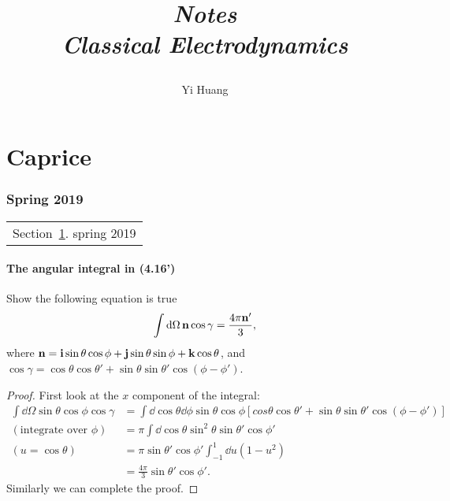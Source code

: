 \documentclass[10pt]{article}
\title{\begin{center}{\Huge \textit{Notes}}\\{{\itshape Classical Electrodynamics}}\end{center}}
\author{Yi Huang}
\affiliation{
University of Minnesota
}
\begin{document}
	\maketitle
	\flushbottom
	\newpage
	\pagestyle{fancynotes}
	\part{Caprice}
	\section{Spring 2019}\label{sec:spring2019}
	\begin{margintable}\vspace{.8in}\footnotesize
		\begin{tabularx}{\marginparwidth}{|X}
		Section~\ref{sec:spring2019}. spring 2019\\
		\end{tabularx}
	\end{margintable}

\subsection{The angular integral in (4.16')}

Show the following equation is true
\begin{equation}
	\int \dd{\Omega} \vb{n} \cos{\gamma} = \frac{4 \pi \vb{n}'}{3},
\end{equation}
where $\vb{n} = \vb{i} \sin{\theta} \cos{\phi} + \vb{j} \sin{\theta} \sin{\phi} + \vb{k} \cos{\theta}$, and $\cos{\gamma} = \cos{\theta} \cos{\theta'} + \sin{\theta} \sin{\theta'} \cos(\phi - \phi')$.
\begin{proof}
	First look at the $x$ component of the integral:
	\begin{align*}
		\int \dd{\Omega} \sin{\theta} \cos{\phi} \cos{\gamma} &= \int \dd{\cos{\theta}} \dd{\phi} \sin{\theta} \cos{\phi} [cos{\theta} \cos{\theta'} + \sin{\theta} \sin{\theta'} \cos(\phi - \phi')] \\
		(\text{integrate over $\phi$}) &= \pi \int \dd{\cos{\theta}} \sin^2{\theta} \sin{\theta'} \cos{\phi'} \\
		(u = \cos{\theta}) &= \pi \sin{\theta'} \cos{\phi'} \int_{-1}^{1} \dd{u} (1-u^2) \\
		&= \frac{4\pi}{3} \sin{\theta'} \cos{\phi'}.
	\end{align*}
	Similarly we can complete the proof.
\end{proof}
\end{document}
